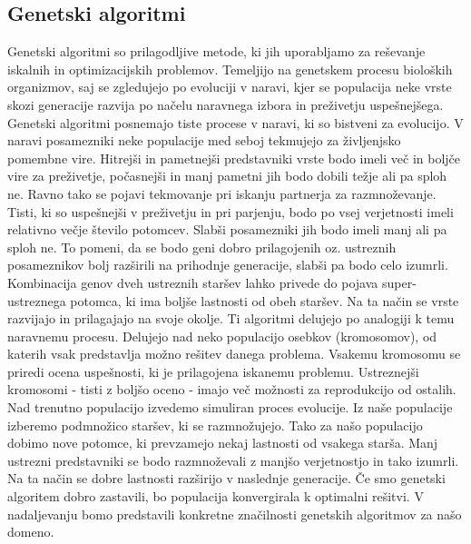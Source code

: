\documentclass[12pt,a4paper,openany]{book}
\begin{document}
\subsection{Genetski algoritmi}
Genetski algoritmi so prilagodljive metode, ki jih uporabljamo za reševanje iskalnih in optimizacijskih problemov. Temeljijo na genetskem procesu bioloških organizmov, saj se zgledujejo po evoluciji v naravi, kjer se populacija neke vrste skozi generacije razvija po načelu naravnega izbora in preživetju uspešnejšega. Genetski algoritmi posnemajo tiste procese v naravi, ki so bistveni za evolucijo. V naravi posamezniki neke populacije med seboj tekmujejo za življenjsko pomembne vire. Hitrejši in pametnejši predstavniki vrste bodo imeli več in boljče vire za preživetje, počasnejši in manj pametni jih bodo dobili težje ali pa sploh ne. Ravno tako se pojavi tekmovanje pri iskanju partnerja za razmnoževanje. Tisti, ki so uspešnejši v preživetju in pri parjenju, bodo po vsej verjetnosti imeli relativno večje število potomcev. Slabši posamezniki jih bodo imeli manj ali pa sploh ne. To pomeni, da se bodo geni dobro prilagojenih oz. ustreznih posameznikov bolj razširili na prihodnje generacije, slabši pa bodo celo izumrli. Kombinacija genov dveh ustreznih staršev
lahko privede do pojava super-ustreznega potomca, ki ima boljše lastnosti od obeh staršev. Na ta način se vrste razvijajo in prilagajajo na svoje okolje.
Ti algoritmi delujejo po analogiji k temu naravnemu procesu. Delujejo nad neko populacijo osebkov (kromosomov), od katerih vsak predstavlja možno rešitev danega problema. Vsakemu kromosomu se priredi ocena uspešnosti, ki je prilagojena iskanemu problemu. Ustreznejši kromosomi - tisti z boljšo oceno - imajo več možnosti za reprodukcijo od ostalih. Nad trenutno populacijo izvedemo simuliran proces evolucije. Iz naše populacije izberemo podmnožico staršev, ki se razmnožujejo. Tako za našo populacijo dobimo nove potomce, ki prevzamejo nekaj lastnosti od vsakega starša. Manj ustrezni predstavniki se bodo razmnoževali z manjšo verjetnostjo in tako izumrli. Na ta način se dobre lastnosti razširijo v naslednje generacije. Če smo genetski algoritem dobro zastavili, bo populacija konvergirala k optimalni rešitvi.
V nadaljevanju bomo predstavili konkretne značilnosti genetskih algoritmov za našo domeno.
\end{document}
